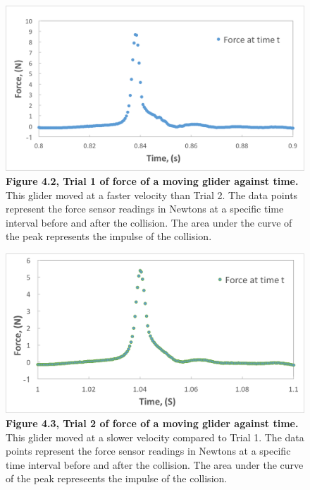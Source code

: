 \documentclass[11pt]{report}
\begin{document}
\begin{figure}[h!]
    \includegraphics[width=\linewidth]{ForceTime1.png}
    \captionsetup{labelformat=empty}
    \caption{\textbf{Figure 4.2, Trial 1 of force of a moving glider against time.}
    This glider moved at a faster velocity than Trial 2.  The data points
represent the force sensor readings in Newtons at a specific time interval before and
after the collision.  The area under the curve of the peak represents the impulse of the collision.}
\end{figure}

\begin{figure}[h!]
    \includegraphics[width=\linewidth]{ForceTime2.png}
    \captionsetup{labelformat=empty}
    \caption{\textbf{Figure 4.3, Trial 2 of force of a moving glider against time.}
    This glider moved at a slower velocity compared to Trial 1. The data points
represent the force sensor readings in Newtons at a specific time interval before 
and after the collision.  The area under the curve of the peak represeents the impulse of the
collision.}
\end{figure}
\end{document}
